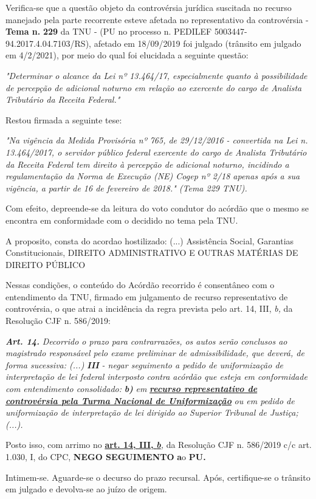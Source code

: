 \documentclass[12pt]{article}
\begin{document}
\justifying
\noindent Verifica-se que a questão objeto da controvérsia jurídica suscitada no recurso manejado pela parte recorrente esteve afetada no representativo da controvérsia - \textbf{Tema n. }\textbf{229} da TNU - (PU no processo n. PEDILEF 5003447-94.2017.4.04.7103/RS),  afetado em 18/09/2019 foi julgado (trânsito em julgado em 4/2/2021), por meio do qual foi elucidada a seguinte questão:

\noindent \textit{"Determinar o alcance da Lei nº 13.464/17, especialmente quanto à possibilidade de percepção de adicional noturno em relação ao exercente do cargo de Analista Tributário da Receita Federal."}

\noindent Restou firmada a seguinte tese:

\noindent \textit{"Na vigência da Medida Provisória nº 765, de 29/12/2016 - convertida na Lei n. 13.464/2017, o servidor público federal exercente do cargo de Analista Tributário da Receita Federal tem direito à percepção de adicional noturno, incidindo a regulamentação da Norma de Execução (NE) Cogep nº 2/18 apenas após a sua vigência, a partir de 16 de fevereiro de 2018." (Tema 229 TNU).}

\noindent Com efeito, depreende-se da leitura do voto condutor do acórdão que o mesmo se encontra em conformidade com o decidido no  tema pela TNU.

\noindent A proposito, consta do acordao hostilizado: (...) Assistência Social, Garantias Constitucionais, DIREITO ADMINISTRATIVO E OUTRAS MATÉRIAS DE DIREITO PÚBLICO

\noindent Nessas condições, o conteúdo do Acórdão recorrido é consentâneo com o entendimento da TNU, firmado em julgamento de recurso representativo de controvérsia, o que atrai a incidência da regra prevista pelo art. 14, III, \textit{b,} da Resolução CJF n. 586/2019:

\noindent \textit{\textbf{Art. 14.}}\textit{ Decorrido o prazo para contrarrazões, os autos serão conclusos ao magistrado responsável pelo exame preliminar de admissibilidade, que deverá, de forma sucessiva: (...) }\textit{\textbf{III }}\textit{- negar seguimento a pedido de uniformização de interpretação de lei federal interposto contra acórdão que esteja em conformidade com entendimento consolidado: }\textit{\textbf{b)}}\textit{ em }\uline{\textit{\textbf{recurso representativo de controvérsia pela Turma Nacional de Uniformização}}}\textit{ ou em pedido de uniformização de interpretação de lei dirigido ao Superior Tribunal de Justiça;(...).}

\noindent Posto isso, com arrimo no \uline{\textbf{art. 14, III, }}\uline{\textit{\textbf{b}}}\textit{,} da Resolução CJF n. 586/2019 c/c art. 1.030, I, do CPC, \textbf{NEGO SEGUIMENTO }\textbf{a}o\textbf{ PU}\textbf{.}

\noindent Intimem-se. Aguarde-se o decurso do prazo recursal. Após, certifique-se o trânsito em julgado e devolva-se ao juízo de origem.
\end{document}
